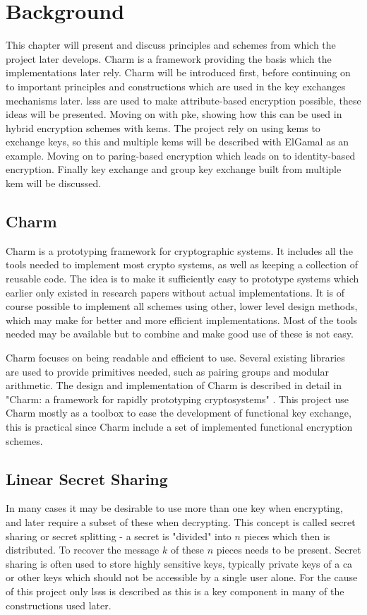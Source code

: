 \chapter{Background}
\label{chp:background} 
This chapter will present and discuss principles and schemes from which the project later develops. Charm is a framework providing the basis which the implementations later rely. Charm will be introduced first, before continuing on to important principles and constructions which are used in the key exchanges mechanisms later. \Gls{lsss} are used to make attribute-based encryption possible, these ideas will be presented. Moving on with \gls{pke}, showing how this can be used in hybrid encryption schemes with \glspl{kem}. The project rely on using \glspl{kem} to exchange keys, so this and multiple \glspl{kem} will be described with ElGamal as an example. Moving on to paring-based encryption which leads on to identity-based encryption. Finally key exchange and group key exchange built from multiple \gls{kem} will be discussed.

\section{Charm}
Charm \cite{DBLP:Charm13} is a prototyping framework for cryptographic systems. It includes all the tools needed to implement most crypto systems, as well as keeping a collection of reusable code. The idea is to make it sufficiently easy to prototype systems which earlier only existed in research papers without actual implementations. It is of course possible to implement all schemes using other, lower level design methods, which may make for better and more efficient implementations. Most of the tools needed may be available but to combine and make good use of these is not easy. 
\par Charm focuses on being readable and efficient to use. Several existing libraries are used to provide primitives needed, such as pairing groups and modular arithmetic. The design and implementation of Charm is described in detail in "Charm: a framework for rapidly prototyping cryptosystems" \cite{DBLP:Charm13}. This project use Charm mostly as a toolbox to ease the development of functional key exchange, this is practical since Charm include a set of implemented functional encryption schemes.


\section{Linear Secret Sharing}\label{subsec:lsss}
In many cases it may be desirable to use more than one key when encrypting, and later require a subset of these when decrypting. This concept is called secret sharing or secret splitting - a secret is "divided" into $n$ pieces which then is distributed. To recover the message $k$ of these $n$ pieces needs to be present. Secret sharing is often used to store highly sensitive keys, typically private keys of a \gls{ca} or other keys which should not be accessible by a single user alone. For the cause of this project only \gls{lsss} is described as this is a key component in many of the constructions used later. 

